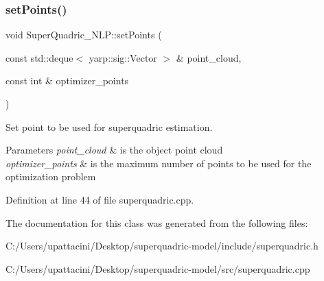\subsubsection{\texorpdfstring{set\+Points()}{setPoints()}}
{\footnotesize\ttfamily void Super\+Quadric\+\_\+\+N\+L\+P\+::set\+Points (\begin{DoxyParamCaption}\item[{const std\+::deque$<$ yarp\+::sig\+::\+Vector $>$ \&}]{point\+\_\+cloud,  }\item[{const int \&}]{optimizer\+\_\+points }\end{DoxyParamCaption})}



Set point to be used for superquadric estimation. 


\begin{DoxyParams}{Parameters}
{\em point\+\_\+cloud} & is the object point cloud \\
\hline
{\em optimizer\+\_\+points} & is the maximum number of points to be used for the optimization problem \\
\hline
\end{DoxyParams}


Definition at line 44 of file superquadric.\+cpp.




The documentation for this class was generated from the following files\+:\begin{DoxyCompactItemize}
\item 
C\+:/\+Users/upattacini/\+Desktop/superquadric-\/model/include/superquadric.\+h\item 
C\+:/\+Users/upattacini/\+Desktop/superquadric-\/model/src/superquadric.\+cpp\end{DoxyCompactItemize}

